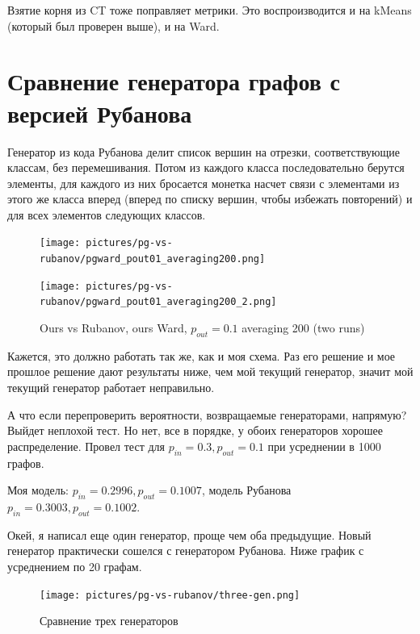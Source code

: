 \documentclass{article}
\begin{document}
Взятие корня из CT тоже поправляет метрики. Это воспроизводится и на kMeans (который был проверен выше), и на Ward.


\section{Сравнение генератора графов с версией Рубанова}

Генератор из кода Рубанова делит список вершин на отрезки, соответствующие классам, без перемешивания. Потом из каждого класса последовательно берутся элементы, для каждого из них бросается монетка насчет связи с элементами из этого же класса вперед (вперед по списку вершин, чтобы избежать повторений) и для всех элементов следующих классов.

\begin{figure}[H] %
	\begin{minipage}{.5\textwidth}
		\centerline{
			\texttt{[image: pictures/pg-vs-rubanov/pgward\_pout01\_averaging200.png]}
		}
	\end{minipage}%
	\begin{minipage}{.5\textwidth}
		\centerline{
			\texttt{[image: pictures/pg-vs-rubanov/pgward\_pout01\_averaging200\_2.png]}
		}
	\end{minipage}%
\caption{\label{f_Rcur}Ours vs Rubanov, ours Ward, $p_{out}=0.1$ averaging 200 (two runs)}
\end{figure}

Кажется, это должно работать так же, как и моя схема. Раз его решение и мое прошлое решение дают результаты ниже, чем мой текущий генератор, значит мой текущий генератор работает неправильно.

А что если перепроверить вероятности, возвращаемые генераторами, напрямую? Выйдет неплохой тест.
Но нет, все в порядке, у обоих генераторов хорошее распределение. Провел тест для $p_{in} = 0.3, p_{out} = 0.1$ при усреднении в 1000 графов.

Моя модель: $p_{in} = 0.2996, p_{out} = 0.1007$, модель Рубанова $p_{in} = 0.3003, p_{out} = 0.1002$.

Окей, я написал еще один генератор, проще чем оба предыдущие. Новый генератор практически сошелся с генератором Рубанова. Ниже график с усреднением по 20 графам.

\begin{figure}[H]
	\texttt{[image: pictures/pg-vs-rubanov/three-gen.png]}
	\caption{\label{f_vs2} Сравнение трех генераторов}
\end{figure}
\end{document}
